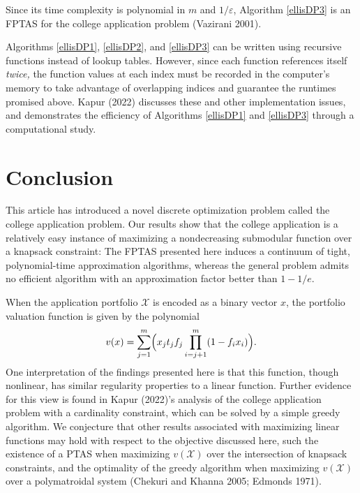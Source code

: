 \documentclass[11pt]{article} %
\theoremstyle{definition}
\begin{document}
Since its time complexity is polynomial in $m$ and $1 / \varepsilon$, Algorithm \ref{ellisDP3} is an FPTAS for the college application problem (Vazirani 2001). 

Algorithms \ref{ellisDP1}, \ref{ellisDP2}, and \ref{ellisDP3} can be written using recursive functions instead of lookup tables. However, since each function references itself \emph{twice,} the function values at each index must be recorded in the computer's memory to take advantage of overlapping indices and guarantee the runtimes promised above. Kapur (2022) discusses these and other implementation issues, and demonstrates the efficiency of Algorithms \ref{ellisDP1} and \ref{ellisDP3} through a computational study.









\section{Conclusion} \label{sectionConclusion}

This article has introduced a novel discrete optimization problem called the college application problem. Our results show that the college application is a relatively easy instance of maximizing a nondecreasing submodular function over a knapsack constraint: The FPTAS presented here induces a continuum of tight, polynomial-time approximation algorithms, whereas the general problem admits no efficient algorithm with an approximation factor better than $1 - 1/e$.

When the application portfolio $\mathcal{X}$ is encoded as a binary vector $x$, the portfolio valuation function is given by the polynomial
\begin{equation} 
v(x) = \sum_{j=1}^m \Bigl( x_j t_j f_j \prod_{i = j+1}^m (1 - f_{i} x_{i}) \Bigr). \label{closedformportfoliovaluationx}\end{equation}
One interpretation of the findings presented here is that this function, though nonlinear, has similar regularity properties to a linear function. Further evidence for this view is found in Kapur (2022)'s analysis of the college application problem with a cardinality constraint, which can be solved by a simple greedy algorithm. We conjecture that other results associated with maximizing linear functions may hold with respect to the objective discussed here, such the existence of a PTAS when maximizing $v(\mathcal{X})$ over the intersection of knapsack constraints, and the optimality of the greedy algorithm when maximizing $v(\mathcal{X})$ over a polymatroidal system (Chekuri and Khanna 2005; Edmonds 1971).
\end{document}
